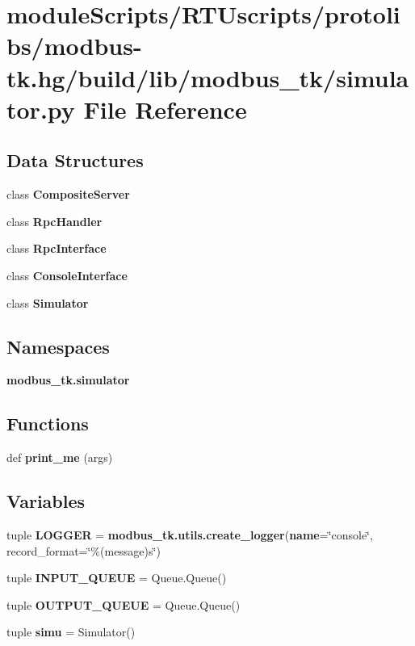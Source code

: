 \section{module\+Scripts/\+R\+T\+Uscripts/protolibs/modbus-\/tk.hg/build/lib/modbus\+\_\+tk/simulator.py File Reference}
\label{protolibs_2modbus-tk_8hg_2build_2lib_2modbus__tk_2simulator_8py}
\subsection*{Data Structures}
\begin{DoxyCompactItemize}
\item 
class {\bf Composite\+Server}
\item 
class {\bf Rpc\+Handler}
\item 
class {\bf Rpc\+Interface}
\item 
class {\bf Console\+Interface}
\item 
class {\bf Simulator}
\end{DoxyCompactItemize}
\subsection*{Namespaces}
\begin{DoxyCompactItemize}
\item 
 {\bf modbus\+\_\+tk.\+simulator}
\end{DoxyCompactItemize}
\subsection*{Functions}
\begin{DoxyCompactItemize}
\item 
def {\bf print\+\_\+me} (args)
\end{DoxyCompactItemize}
\subsection*{Variables}
\begin{DoxyCompactItemize}
\item 
tuple {\bf L\+O\+G\+G\+E\+R} = {\bf modbus\+\_\+tk.\+utils.\+create\+\_\+logger}({\bf name}=\char`\"{}console\char`\"{}, record\+\_\+format=\char`\"{}\%(message)s\char`\"{})
\item 
tuple {\bf I\+N\+P\+U\+T\+\_\+\+Q\+U\+E\+U\+E} = Queue.\+Queue()
\item 
tuple {\bf O\+U\+T\+P\+U\+T\+\_\+\+Q\+U\+E\+U\+E} = Queue.\+Queue()
\item 
tuple {\bf simu} = Simulator()
\end{DoxyCompactItemize}
